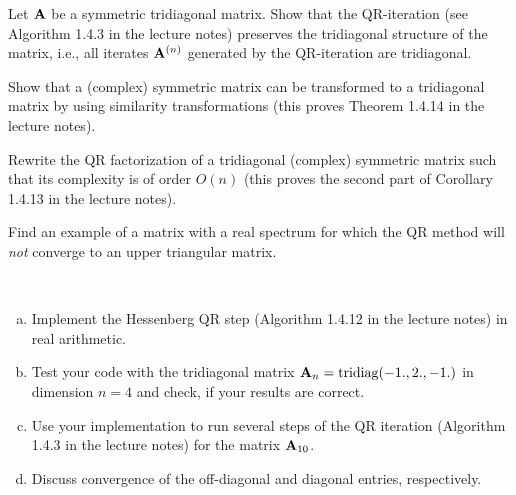
\begin{Sheet}

  \begin{Problem}
    Let $\mathbf A$ be a symmetric tridiagonal matrix. Show that the
    QR-iteration (see Algorithm 1.4.3 in the lecture notes) preserves
    the tridiagonal structure of the matrix, i.e., all iterates
    $\mathbf A^{(n)}$ generated by the QR-iteration are tridiagonal.
  \end{Problem}

  \begin{Problem}
    Show that a (complex) symmetric matrix can be transformed to a
    tridiagonal matrix by using similarity transformations (this
    proves Theorem 1.4.14 in the lecture notes).
  \end{Problem}

  \begin{Problem}
    Rewrite the QR factorization of a tridiagonal (complex) symmetric
    matrix such that its complexity is of order $O(n)$ (this proves
    the second part of Corollary 1.4.13 in the lecture notes).
  \end{Problem}

  \begin{Problem}
    Find an example of a matrix with a real spectrum for which the QR
    method will \textit{not} converge to an upper triangular matrix.
  \end{Problem}

  \begin{Problem}[Programming]
    \hfill\\\vspace{-6ex}
    \begin{enumerate}[(a)]
    \item Implement the Hessenberg QR step (Algorithm 1.4.12 in the
      lecture notes) in real arithmetic.
    \item Test your code with the tridiagonal matrix
      $\mathbf A_n=\operatorname{tridiag}(-1.,2.,-1.)$ in dimension $n=4$
      and check, if your results are correct.
    \item Use your implementation to run several steps of the QR
      iteration (Algorithm 1.4.3 in the lecture notes) for the matrix
      $\mathbf A_{10}$.
    \item Discuss convergence of the off-diagonal and diagonal
      entries, respectively.
    \end{enumerate}
  \end{Problem}

\end{Sheet}


